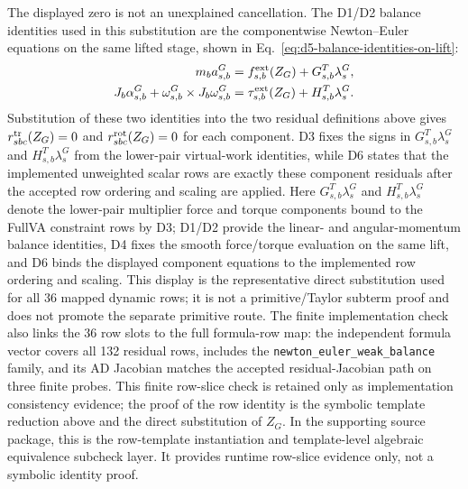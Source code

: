 \documentclass[preprint,12pt]{elsarticle}
\begin{document}
The displayed zero is not an unexplained cancellation. The D1/D2
balance identities used in this substitution are the componentwise
Newton--Euler equations on the same lifted stage, shown in
Eq.~\eqref{eq:d5-balance-identities-on-lift}:
\begin{equation}
\label{eq:d5-balance-identities-on-lift}
\begin{aligned}
m_b a^G_{s,b}
&=f^{\rm ext}_{s,b}(Z_G)+G_{s,b}^{T}\lambda^G_s,\\
J_b\alpha^G_{s,b}
+\omega^G_{s,b}\times J_b\omega^G_{s,b}
&=\tau^{\rm ext}_{s,b}(Z_G)+H_{s,b}^{T}\lambda^G_s .
\end{aligned}
\end{equation}
Substitution of these two identities into the two residual definitions above
gives \(r^{\rm tr}_{sbc}(Z_G)=0\) and
\(r^{\rm rot}_{sbc}(Z_G)=0\) for each component.  D3 fixes the signs in
\(G_{s,b}^{T}\lambda^G_s\) and \(H_{s,b}^{T}\lambda^G_s\) from the
lower-pair virtual-work identities, while D6 states that the implemented
unweighted scalar rows are exactly these component residuals after the
accepted row ordering and scaling are applied.
Here \(G_{s,b}^{T}\lambda^G_s\) and
\(H_{s,b}^{T}\lambda^G_s\) denote the lower-pair multiplier force and torque
components bound to the FullVA constraint rows by D3; D1/D2 provide the
linear- and angular-momentum balance identities, D4 fixes the smooth
force/torque evaluation on the same lift, and D6 binds the displayed
component equations to the implemented row ordering and scaling. This display
is the representative direct substitution used for all 36 mapped dynamic
rows; it is not a primitive/Taylor subterm proof and does not promote the
separate primitive route.
The finite implementation check also links the 36 row slots to the full
formula-row map: the independent formula vector covers all 132 residual rows,
includes the \texttt{newton\_euler\_weak\_balance} family, and its AD Jacobian
matches the accepted residual-Jacobian path on three finite probes. This
finite row-slice check is retained only as implementation consistency
evidence; the proof of the row identity is the symbolic template reduction
above and the direct substitution of \(Z_G\).
In the supporting source package, this is the row-template instantiation and
template-level algebraic equivalence subcheck layer. It provides runtime
row-slice evidence only, not a symbolic identity proof.
\end{document}
